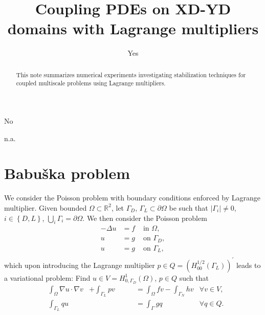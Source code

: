 \documentclass[r]{siamart171218}
\title{Coupling PDEs on XD-YD domains with Lagrange multipliers}
\author{Yes}
\begin{document}
\maketitle

\begin{abstract}
  This note summarizes numerical experiments investigating stabilization
  techniques for coupled multiscale problems using Lagrange multipliers. 
\end{abstract}

\begin{keywords}
No
\end{keywords}

\begin{AMS}
n.a.
\end{AMS}

 
\newcommand{\semi}[1]{\lvert{#1}\rvert}
\newcommand{\norm}[1]{\lVert{#1}\rVert}

\newtheorem{thm}{Theorem}[section]
\newtheorem{prop}{Property}[section]
\theoremstyle{remark}
\newtheorem{remark}{Remark}[section]
 

\section{Babu{\v s}ka problem}\label{sec:babuska}
We consider the Poisson problem with boundary conditions enforced by
Lagrange multiplier. Given bounded $\Omega\subset\mathbb{R}^2$, let $\Gamma_D$,
$\Gamma_L\subset \partial \Omega$ be such that $\semi{\Gamma_i}\neq 0$,
$i\in\left\{D, L\right\}$, $\bigcup_{i}\Gamma_i=\partial\Omega$.
We then consider the Poisson problem
\[
\begin{aligned}
-\Delta u &= f &\mbox{ in }\Omega,\\
u &= g &\mbox{ on }\Gamma_D,\\
u &= g &\mbox{ on }\Gamma_L,\\
\end{aligned}
\]
which upon introducing the Lagrange multiplier $p\in Q=(H^{1/2}_{00}(\Gamma_L))^{\prime}$
leads to a variational problem: Find $u\in V=H^1_{0, \Gamma_D}(\Omega)$,
$p\in Q$ such that
%
\begin{equation}\label{eq:bab}
  \begin{aligned}
    &\int_{\Omega} \nabla u\cdot \nabla v &+ \int_{\Gamma_L}p v &= \int_{\Omega} f v - \int_{\Gamma_N}h v &\forall v\in V,\\
    &\int_{\Gamma_L}q u  &\phantom{+\int_{\Omega} \nabla u\cdot \nabla v} &= \int_{\Gamma} g q &\forall q\in Q.
  \end{aligned}
\end{equation}
%
\end{document}
